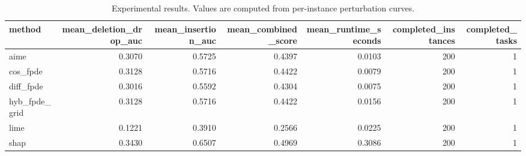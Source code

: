 \begin{table}[t]
\caption{Experimental results. Values are computed from per-instance perturbation curves.}
\label{tab:main_results_computed}
\centering
\begin{tabular}{lrrrrrr}
\toprule
method & mean\_deletion\_drop\_auc & mean\_insertion\_auc & mean\_combined\_score & mean\_runtime\_seconds & completed\_instances & completed\_tasks \\
\midrule
aime & 0.3070 & 0.5725 & 0.4397 & 0.0103 & 200 & 1 \\
cos\_fpde & 0.3128 & 0.5716 & 0.4422 & 0.0079 & 200 & 1 \\
diff\_fpde & 0.3016 & 0.5592 & 0.4304 & 0.0075 & 200 & 1 \\
hyb\_fpde\_grid & 0.3128 & 0.5716 & 0.4422 & 0.0156 & 200 & 1 \\
lime & 0.1221 & 0.3910 & 0.2566 & 0.0225 & 200 & 1 \\
shap & 0.3430 & 0.6507 & 0.4969 & 0.3086 & 200 & 1 \\
\bottomrule
\end{tabular}

\end{table}

